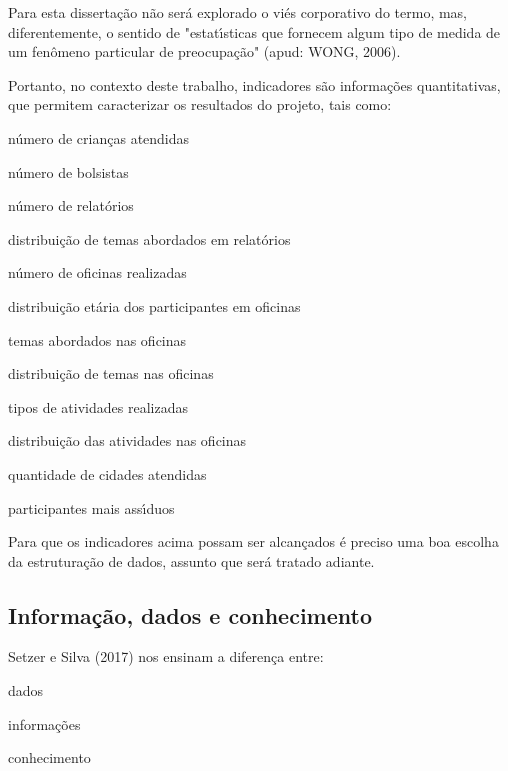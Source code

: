 \documentclass[
12pt,		%
openright,	%
twoside,  %
a4paper,			%
chapter=TITLE,		%
english,			%
french,				%
spanish,			%
brazil				%
]{USPSC-classe/USPSC}
\begin{document}
Para esta disserta\c{c}\~ao n\~ao ser\'a explorado o vi\'es corporativo do termo, mas, diferentemente, o sentido de "estat\'{\i}sticas que fornecem algum tipo de medida de um fen\^omeno particular de preocupa\c{c}\~ao" (apud: WONG, 2006).


Portanto, no contexto deste trabalho, indicadores s\~ao informa\c{c}\~oes quantitativas, que permitem caracterizar os resultados do projeto, tais como:



\begin{alineas}
\item n\'umero de crian\c{c}as atendidas
\item n\'umero de bolsistas
\item n\'umero de relat\'orios
\item distribui\c{c}\~ao de temas abordados em relat\'orios
\item n\'umero de oficinas realizadas
\item distribui\c{c}\~ao et\'aria dos participantes em oficinas
\item temas abordados nas oficinas
\item distribui\c{c}\~ao de temas nas oficinas
\item tipos de atividades realizadas
\item distribui\c{c}\~ao das atividades nas oficinas
\item quantidade de cidades atendidas
\item participantes mais ass\'{\i}duos
\end{alineas}

Para que os indicadores acima possam ser alcan\c{c}ados \'e preciso uma boa escolha da estrutura\c{c}\~ao de dados, assunto que ser\'a tratado adiante.


\subsection[Informa\c{c}\~ao, dados e conhecimento]{Informa\c{c}\~ao, dados e conhecimento}\label{Informa\c{c}\~ao, dados e conhecimento}
 Setzer e Silva (2017)  nos ensinam a diferen\c{c}a entre:



\begin{alineas}
\item dados
\item informa\c{c}\~oes
\item conhecimento
\end{alineas}
\end{document}
